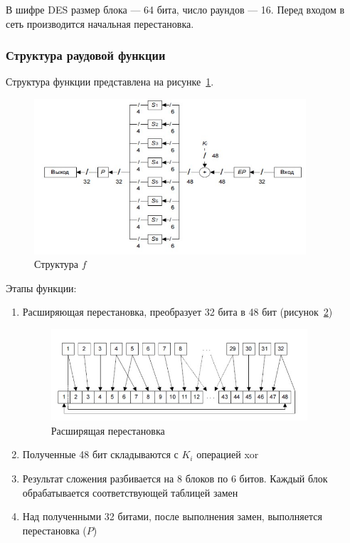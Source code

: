 \documentclass[a4paper, 14pt]{extarticle}
\begin{document}
В шифре DES размер блока --- 64 бита, число раундов --- 16. Перед входом в сеть производится начальная перестановка.

\FloatBarrier{}

\subsubsection{Структура раудовой функции}
Структура функции представлена на рисунке~\ref{img:1:2}.
\begin{figure}[h]
    \centering
    \includegraphics[width=0.9\textwidth]{./img/S002.jpg}
    \caption{Структура $f$}%
    \label{img:1:2}
\end{figure}

Этапы функции:
\begin{enumerate}
    \item Расширяющая перестановка, преобразует 32 бита в 48 бит (рисунок~\ref{img:1:3})
        \begin{figure}[h]
            \centering
            \includegraphics[width=0.9\textwidth]{./img/S003.jpg}
            \caption{Расширящая перестановка}%
            \label{img:1:3}
        \end{figure}
    \item Полученные 48 бит складываются с $K_i$ операцией xor
    \item Результат сложения разбивается на 8 блоков по 6 битов. Каждый блок обрабатывается соответствующей таблицей замен
    \item Над полученными 32 битами, после выполнения замен, выполняется перестановка ($P$)
\end{enumerate}
\end{document}
